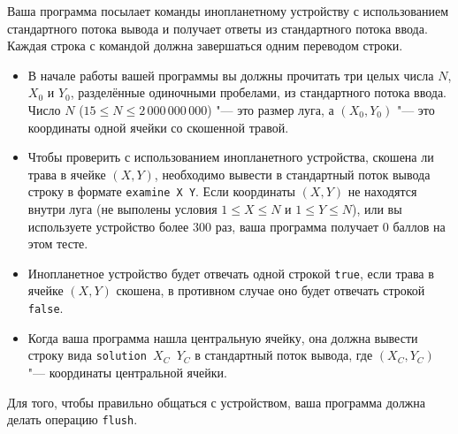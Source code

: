Ваша программа посылает команды инопланетному устройству с использованием
стандартного потока вывода и получает ответы из стандартного потока ввода.
Каждая строка с командой должна завершаться одним переводом строки.
\begin{itemize}
	\item
	В начале работы вашей программы вы должны прочитать три целых числа
	$N$, $X_0$ и $Y_0$, разделённые одиночными пробелами,
	из стандартного потока ввода.
	Число $N$ ($15 \le N \le 2\,000\,000\,000$) "--- это размер луга, а $(X_0, Y_0)$ "---
	это координаты одной ячейки со скошенной травой.
	\item
	Чтобы проверить с использованием инопланетного устройства,
	скошена ли трава в ячейке $(X, Y)$, необходимо вывести
	в стандартный поток вывода строку в формате \texttt{examine~X~Y}.
	Если координаты $(X, Y)$ не находятся внутри луга (не выполены
	условия $1 \le X \le N$ и $1 \le Y \le N$), или вы используете
	устройство более $300$ раз, ваша программа получает 0 баллов
	на этом тесте.
	\item
	Инопланетное устройство будет отвечать одной строкой \texttt{true},
	если трава в ячейке $(X, Y)$ скошена,
	в противном случае оно будет отвечать строкой \texttt{false}.
	\item
	Когда ваша программа нашла центральную ячейку, она должна вывести
	строку вида \texttt{solution $X_C$ $Y_C$} в стандартный поток вывода,
	где $(X_C, Y_C)$ "--- координаты центральной ячейки.
\end{itemize}
Для того, чтобы правильно общаться с устройством, ваша программа должна
делать операцию \texttt{flush}.

